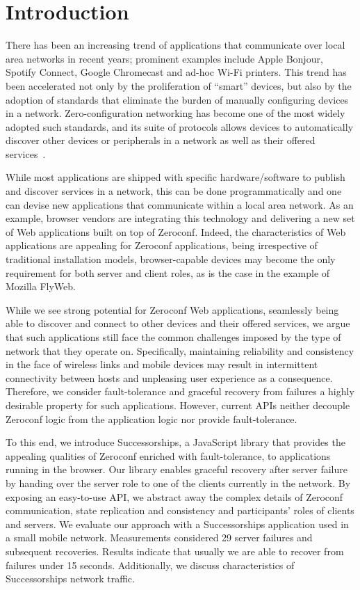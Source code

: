 \section{Introduction}
\label{sec:introduction}

There has been an increasing trend of applications that communicate over local area networks in recent years; prominent examples include Apple Bonjour, Spotify Connect, Google Chromecast and ad-hoc Wi-Fi printers.
This trend has been accelerated not only by the proliferation of ``smart'' devices, but also by the adoption of standards that eliminate the burden of manually configuring devices in a network.
Zero-configuration networking has become one of the most widely adopted such standards, and its suite of protocols allows devices to automatically discover other devices or peripherals in a network as well as their offered services~\cite{rfc6762, rfc6763}.


While most applications are shipped with specific hardware/software to publish and discover services in a network, this can be done programmatically and one can devise new applications that communicate within a local area network.
As an example, browser vendors are integrating this technology and delivering a new set of Web applications built on top of Zeroconf.
Indeed, the characteristics of Web applications are appealing for Zeroconf applications, being irrespective of traditional installation models, browser-capable devices may become the only requirement for both server and client roles, as is the case in the example of Mozilla FlyWeb.

While we see strong potential for Zeroconf Web applications, seamlessly being able to discover and connect to other devices and their offered services, we argue that such applications still face the common challenges imposed by the type of network that they operate on.
Specifically, maintaining reliability and consistency in the face of wireless links and mobile devices may result in intermittent connectivity between hosts and unpleasing user experience as a consequence.
Therefore, we consider fault-tolerance and graceful recovery from failures a highly desirable property for such applications.
However, current APIs neither decouple Zeroconf logic from the application logic nor provide fault-tolerance.

To this end, we introduce Successorships, a JavaScript library that provides the appealing qualities of Zeroconf enriched with fault-tolerance, to applications running in the browser.
Our library enables graceful recovery after server failure by handing over the server role to one of the clients currently in the network.
By exposing an easy-to-use API, we abstract away the complex details of Zeroconf communication, state replication and consistency and participants’ roles of clients and servers.
We evaluate our approach with a Successorships application used  in a small mobile network.
Measurements considered 29 server failures and subsequent recoveries.
Results indicate that usually we are able to recover from failures under 15 seconds.
Additionally, we discuss characteristics of Successorships network traffic.

